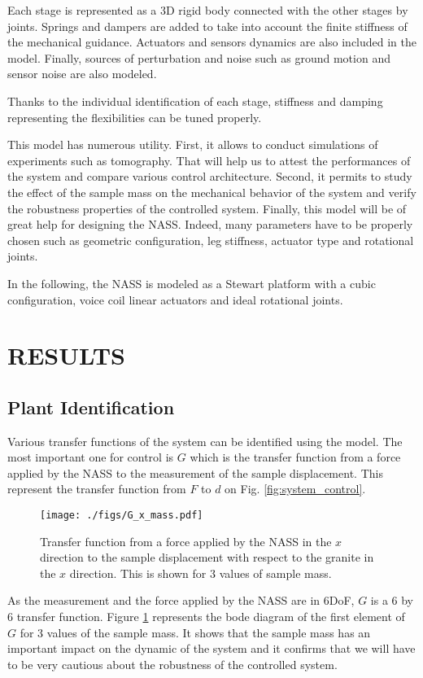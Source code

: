 \documentclass[a4paper, keeplastbox, biblatex]{jacow}
\begin{document}
Each stage is represented as a 3D rigid body connected with the other stages by joints. Springs and dampers are added to take into account the finite stiffness of the mechanical guidance.
Actuators and sensors dynamics are also included in the model.
Finally, sources of perturbation and noise such as ground motion and sensor noise are also modeled.

Thanks to the individual identification of each stage, stiffness and damping representing the flexibilities can be tuned properly.

This model has numerous utility.
First, it allows to conduct simulations of experiments such as tomography. That will help us to attest the performances of the system and compare various control architecture.
Second, it permits to study the effect of the sample mass on the mechanical behavior of the system and verify the robustness properties of the controlled system.
Finally, this model will be of great help for designing the NASS. Indeed, many parameters have to be properly chosen such as geometric configuration, leg stiffness, actuator type and rotational joints.

In the following, the NASS is modeled as a Stewart platform with a cubic configuration, voice coil linear actuators and ideal rotational joints.

\section{RESULTS}
\label{sec:org016c64e}
\subsection{Plant Identification}
\label{sec:orgc4eb023}
Various transfer functions of the system can be identified using the model.
The most important one for control is \(G\) which is the transfer function from a force applied by the NASS to the measurement of the sample displacement. This represent the transfer function from \(F\) to \(d\) on Fig. \ref{fig:system_control}.

\begin{figure}[htbp]
\centering
\texttt{[image: ./figs/G\_x\_mass.pdf]}
\caption{\label{fig:G_x_mass}
Transfer function from a force applied by the NASS in the \(x\) direction to the sample displacement with respect to the granite in the \(x\) direction. This is shown for 3 values of sample mass.}
\end{figure}

As the measurement and the force applied by the NASS are in 6DoF, \(G\) is a 6 by 6 transfer function.
Figure \ref{fig:G_x_mass} represents the bode diagram of the first element of \(G\) for 3 values of the sample mass.
It shows that the sample mass has an important impact on the dynamic of the system and it confirms that we will have to be very cautious about the robustness of the controlled system.
\end{document}
